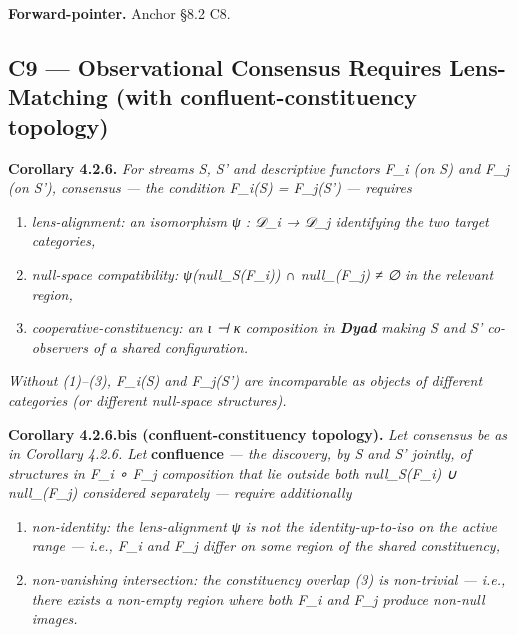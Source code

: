 \documentclass[11pt, openany]{book}
\begin{document}
\textbf{Forward-pointer.} Anchor §8.2 C8.

\subsection{C9 --- Observational Consensus Requires Lens-Matching (with confluent-constituency topology)}

\textbf{Corollary 4.2.6.} \textit{For streams S, S' and descriptive functors F\_\allowbreak{}i (on S) and F\_\allowbreak{}j (on S'), consensus --- the condition F\_\allowbreak{}i(S) = F\_\allowbreak{}j(S') --- requires}

\begin{enumerate}
\item \textit{lens-alignment: an isomorphism ψ : 𝒟\_\allowbreak{}i → 𝒟\_\allowbreak{}j identifying the two target categories,}
\item \textit{null-space compatibility: ψ(null\_\allowbreak{}S(F\_\allowbreak{}i)) ∩ null\_(F\_\allowbreak{}j) ≠ ∅ in the relevant region,}
\item \textit{cooperative-constituency: an ι ⊣ κ composition in \textbf{Dyad} making S and S' co-observers of a shared configuration.}
\end{enumerate}

\textit{Without (1)–(3), F\_\allowbreak{}i(S) and F\_\allowbreak{}j(S') are incomparable as objects of different categories (or different null-space structures).}

\textbf{Corollary 4.2.6.bis (confluent-constituency topology).} \textit{Let consensus be as in Corollary 4.2.6. Let} \textbf{confluence} \textit{--- the discovery, by S and S' jointly, of structures in F\_\allowbreak{}i ∘ F\_\allowbreak{}j composition that lie outside both null\_\allowbreak{}S(F\_\allowbreak{}i) ∪ null\_(F\_\allowbreak{}j) considered separately --- require additionally}

\begin{enumerate}
\item \textit{non-identity: the lens-alignment ψ is not the identity-up-to-iso on the active range --- i.e., F\_\allowbreak{}i and F\_\allowbreak{}j differ on some region of the shared constituency,}
\item \textit{non-vanishing intersection: the constituency overlap (3) is non-trivial --- i.e., there exists a non-empty region where both F\_\allowbreak{}i and F\_\allowbreak{}j produce non-null images.}
\end{enumerate}
\end{document}
